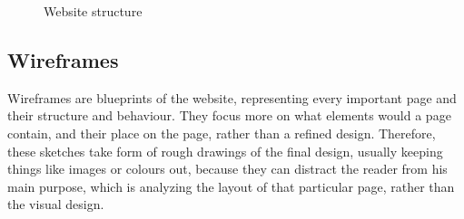 \documentclass{l3proj}
\begin{document}
\begin{figure}
\begin{center}
		\qquad

	\end{center}
	\label{fig:website-structure}
	\caption{Website structure}
\end{figure}

\subsection{Wireframes}
% 
% 
Wireframes are blueprints of the website, representing every important page and 
their structure and behaviour.
They focus more on what elements would a page contain, and their place on
the page, rather than a refined design. Therefore, these sketches take form of
rough drawings of the final design, usually keeping things like images or
colours out, because they can distract the reader from his main purpose, which
is analyzing the layout of that particular page, rather than the visual design.
\end{document}

